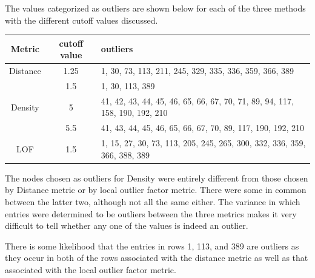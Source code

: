\documentclass[11pt]{article}
\begin{document}
\begin{enumerate}
\begin{itemize}
\end{itemize}


The values categorized as outliers are shown below for each of the three methods with the different cutoff values discussed. 

\begin{center}
\begin{tabular}{| c | c | l |}
\hline
Metric & cutoff value & outliers\\ \hline
Distance & 1.25 & 1, 30,  73, 113, 211, 245, 329, 335, 336, 359, 366, 389 \\ \hline
& 1.5 & 1, 30, 113, 389 \\ \hline
Density & 5 & 41,  42,  43,  44,  45,  46,  65,  66,  67,  70,  71,  89,  94, 117, 158, 190, 192, 210\\ \hline
& 5.5 & 41,  43,  44,  45,  46,  65,  66,  67,  70,  89, 117, 190, 192, 210 \\ \hline
LOF & 1.5 & 1,  15,  27,  30,  73, 113, 205, 245, 265, 300, 332, 336, 359, 366, 388, 389 \\ \hline
\end{tabular}
\end{center}

The nodes chosen as outliers for Density were entirely different from those chosen by Distance metric or by local outlier factor 
metric. There were some in common between the latter two, although not all the same either. The variance in which entries were 
determined to be outliers between the three metrics makes it very difficult to tell whether any one of the values is indeed an outlier. 

There is some likelihood that the entries in rows 1, 113, and 389 are outliers as they occur in both of the rows associated with 
the distance metric as well as that associated with the local outlier factor metric. 

\end{enumerate}

\pagebreak

\end{document}
